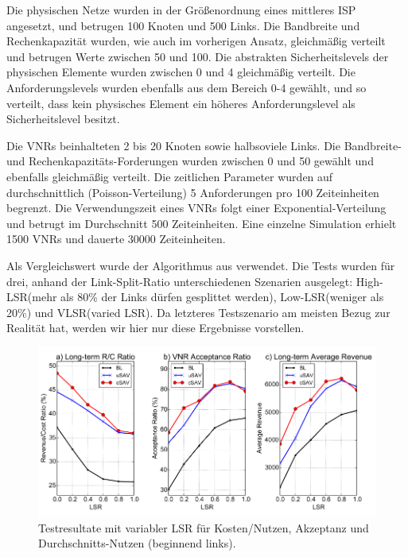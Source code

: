 \documentclass{lni}
\begin{document}
Die physischen Netze wurden in der Größenordnung eines mittleres ISP angesetzt, und betrugen 100 Knoten und 500 Links. Die Bandbreite und Rechenkapazität wurden, wie auch im vorherigen Ansatz, gleichmäßig verteilt und betrugen Werte zwischen 50 und 100. Die abstrakten Sicherheitslevels der physischen Elemente wurden zwischen 0 und 4 gleichmäßig verteilt. Die Anforderungslevels wurden ebenfalls aus dem Bereich 0-4 gewählt, und so verteilt, dass kein physisches Element ein höheres Anforderungslevel als Sicherheitslevel besitzt.

Die VNRs beinhalteten 2 bis 20 Knoten sowie halbsoviele Links. Die Bandbreite- und Rechenkapazitäts-Forderungen wurden zwischen 0 und 50 gewählt und ebenfalls gleichmäßig verteilt.
Die zeitlichen Parameter wurden auf durchschnittlich (Poisson-Verteilung) 5 Anforderungen pro 100 Zeiteinheiten begrenzt. Die Verwendungszeit eines VNRs folgt einer Exponential-Verteilung und betrugt im Durchschnitt 500 Zeiteinheiten. Eine einzelne Simulation erhielt 1500 VNRs und dauerte 30000 Zeiteinheiten. 

Als Vergleichswert wurde der Algorithmus aus \cite{comp} verwendet. Die Tests wurden für drei, anhand der Link-Split-Ratio unterschiedenen Szenarien ausgelegt: 
High-LSR(mehr als 80\% der Links dürfen gesplittet werden),
Low-LSR(weniger als 20\%) und VLSR(varied LSR). Da letzteres Testszenario am meisten Bezug zur Realität hat, werden wir hier nur diese Ergebnisse vorstellen. 

\begin{figure}[htb]
\begin{center}
	\includegraphics[width=1\textwidth]{perf_algo2.pdf}\newline
	\caption{\label{graph12} Testresultate mit variabler LSR für Kosten/Nutzen, Akzeptanz und Durchschnitts-Nutzen (beginnend links).\cite{algo2}}
\end{center}
\end{figure}
\end{document}
